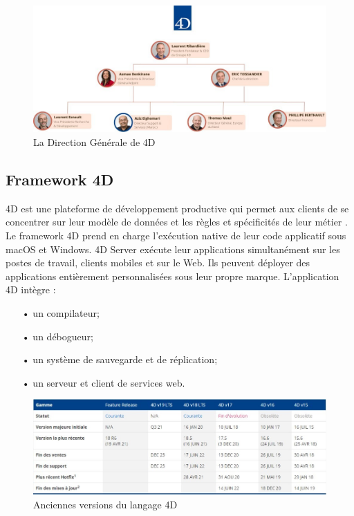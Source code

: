 \begin{figure}[h]
    \centering
    \includegraphics[scale=0.35]{Images/direction.jpg} %
    \caption{La Direction Générale de 4D}
    \label{fig:direction}
\end{figure}

\subsection{Framework 4D}
4D est une plateforme de développement productive qui permet aux clients de se concentrer sur leur modèle de données et les règles et spécificités de leur métier \cite{4d}. 
Le framework 4D prend en charge l’exécution native de leur code applicatif sous macOS et Windows. 
4D Server exécute leur applications simultanément sur les postes de travail, clients mobiles et sur le Web. 
Ils peuvent déployer des applications entièrement personnalisées sous leur propre marque.
L'application 4D intègre :
\begin{itemize}
    \item[•] un compilateur;
    \item[•] un débogueur;
    \item[•] un système de sauvegarde et de réplication;
    \item[•] un serveur et client de services web.
\end{itemize}


\begin{figure}[h]
    \centering
    \includegraphics[scale=0.6]{Images/versions.jpg} %
    \caption{Anciennes versions du langage 4D}
    \label{fig:versions}
\end{figure}

